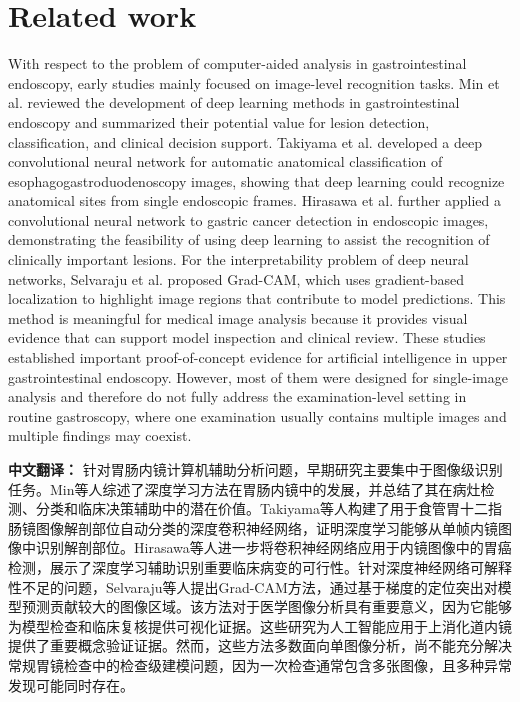 \documentclass[Afour,sagev,times]{sagej}
\begin{document}
\section{Related work}
With respect to the problem of computer-aided analysis in gastrointestinal endoscopy, early studies mainly focused on image-level recognition tasks. Min et al. reviewed the development of deep learning methods in gastrointestinal endoscopy and summarized their potential value for lesion detection, classification, and clinical decision support. Takiyama et al. developed a deep convolutional neural network for automatic anatomical classification of esophagogastroduodenoscopy images, showing that deep learning could recognize anatomical sites from single endoscopic frames. Hirasawa et al. further applied a convolutional neural network to gastric cancer detection in endoscopic images, demonstrating the feasibility of using deep learning to assist the recognition of clinically important lesions. For the interpretability problem of deep neural networks, Selvaraju et al. proposed Grad-CAM, which uses gradient-based localization to highlight image regions that contribute to model predictions.\cite{R12} This method is meaningful for medical image analysis because it provides visual evidence that can support model inspection and clinical review. These studies established important proof-of-concept evidence for artificial intelligence in upper gastrointestinal endoscopy. However, most of them were designed for single-image analysis and therefore do not fully address the examination-level setting in routine gastroscopy, where one examination usually contains multiple images and multiple findings may coexist.

\textbf{中文翻译：} 针对胃肠内镜计算机辅助分析问题，早期研究主要集中于图像级识别任务。Min等人综述了深度学习方法在胃肠内镜中的发展，并总结了其在病灶检测、分类和临床决策辅助中的潜在价值。Takiyama等人构建了用于食管胃十二指肠镜图像解剖部位自动分类的深度卷积神经网络，证明深度学习能够从单帧内镜图像中识别解剖部位。Hirasawa等人进一步将卷积神经网络应用于内镜图像中的胃癌检测，展示了深度学习辅助识别重要临床病变的可行性。针对深度神经网络可解释性不足的问题，Selvaraju等人提出Grad-CAM方法，通过基于梯度的定位突出对模型预测贡献较大的图像区域。该方法对于医学图像分析具有重要意义，因为它能够为模型检查和临床复核提供可视化证据。这些研究为人工智能应用于上消化道内镜提供了重要概念验证证据。然而，这些方法多数面向单图像分析，尚不能充分解决常规胃镜检查中的检查级建模问题，因为一次检查通常包含多张图像，且多种异常发现可能同时存在。
\end{document}
